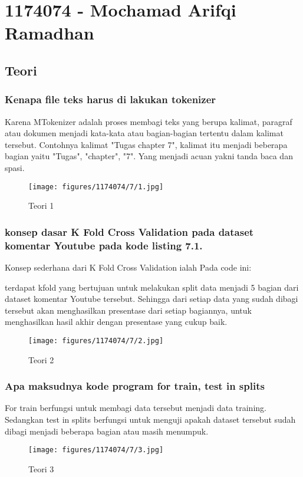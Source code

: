 \section{1174074 - Mochamad Arifqi Ramadhan}
\subsection{Teori}
\subsubsection{Kenapa file teks harus di lakukan tokenizer}
\hfill\break
Karena MTokenizer adalah proses membagi teks yang berupa kalimat, paragraf atau dokumen menjadi kata-kata atau bagian-bagian tertentu dalam kalimat tersebut. Contohnya kalimat "Tugas chapter 7", kalimat itu menjadi beberapa bagian yaitu "Tugas", "chapter", "7". Yang menjadi acuan yakni tanda baca dan spasi.
\begin{figure}[H]
\centering
	\texttt{[image: figures/1174074/7/1.jpg]}
\caption{Teori 1}
\end{figure}

\subsubsection{konsep dasar K Fold Cross Validation pada dataset komentar Youtube pada kode listing 7.1.}
\hfill\break
Konsep sederhana dari K Fold Cross Validation ialah Pada code ini:

terdapat kfold yang bertujuan untuk melakukan split data menjadi 5 bagian dari dataset komentar Youtube tersebut. Sehingga dari setiap data yang sudah dibagi tersebut akan menghasilkan presentase dari setiap bagiannya, untuk menghasilkan hasil akhir dengan presentase yang cukup baik.
\begin{figure}[H]
\centering
	\texttt{[image: figures/1174074/7/2.jpg]}
\caption{Teori 2}
\end{figure}

\subsubsection{Apa maksudnya kode program for train, test in splits}
\hfill\break
For train berfungsi untuk membagi data tersebut menjadi data training. Sedangkan test in splits berfungsi untuk menguji apakah dataset tersebut sudah dibagi menjadi beberapa bagian atau masih menumpuk.
\begin{figure}[H]
\centering
	\texttt{[image: figures/1174074/7/3.jpg]}
\caption{Teori 3}
\end{figure}

